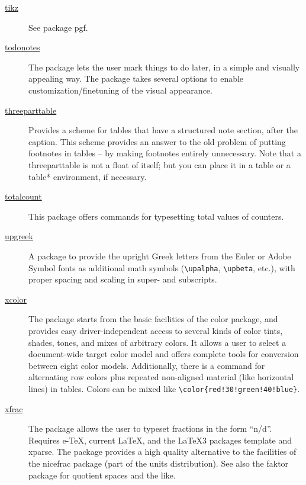 \begin{description}
	\item[\href{https://www.ctan.org/pkg/tikz}{tikz}] See package pgf.
	
	\item[\href{https://www.ctan.org/pkg/todonotes}{todonotes}] The package lets the user mark things to do later, in a simple and visually appealing way. The package takes several options to enable customization/finetuning of the visual appearance. \cite{CTANTeam.2020x}
	
	\item[\href{https://www.ctan.org/pkg/threeparttable}{threeparttable}] Provides a scheme for tables that have a structured note section, after the caption. This scheme provides an answer to the old problem of putting footnotes in tables -- by making footnotes entirely unnecessary. Note that a threeparttable is not a float of itself; but you can place it in a table or a table* environment, if necessary. \cite{CTANTeam.2020f}
	
	\item[\href{https://www.ctan.org/tex-archive/macros/latex/contrib/caption/}{totalcount}] This package offers commands for typesetting total values of counters. \cite{CTANTeam.2020bp}
	
	\item[\href{https://www.ctan.org/pkg/upgreek}{upgreek}] A package to provide the upright Greek letters from the Euler or Adobe Symbol fonts as additional math symbols (\verb|\upalpha|, \verb|\upbeta|, etc.), with proper spacing and scaling in super- and subscripts. \cite{CTANTeam.2020bi}
	
	\item[\href{https://www.ctan.org/pkg/xcolor}{xcolor}] The package starts from the basic facilities of the color package, and provides easy driver-independent access to several kinds of color tints, shades, tones, and mixes of arbitrary colors. It allows a user to select a document-wide target color model and offers complete tools for conversion between eight color models. Additionally, there is a command for alternating row colors plus repeated non-aligned material (like horizontal lines) in tables. Colors can be mixed like \verb|\color{red!30!green!40!blue}|. \cite{CTANTeam.2020au}
	
	\item[\href{https://www.ctan.org/pkg/xfrac}{xfrac}] The package allows the user to typeset fractions in the form \enquote{n/d}. Requires e-{\TeX}, current {\LaTeX}, and the {\LaTeX}3 packages template and xparse. The package provides a high quality alternative to the facilities of the nicefrac package (part of the units distribution). See also the faktor package for quotient spaces and the like. \cite{CTANTeam.2020bj}
	

\end{description}

